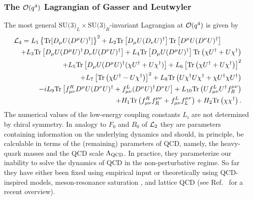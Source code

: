 \documentclass[twoside,12pt]{article}
\begin{document}
\subsubsection{The ${\cal O}(q^4)$ Lagrangian of Gasser and Leutwyler}
\label{subsubsec_clop4}
   The most general $\mbox{SU(3)}_L\times\mbox{SU(3)}_R$-invariant Lagrangian at ${\cal O}(q^4)$
is given by \cite{Gasser:1984gg}
\begin{eqnarray}
\label{3:3:1:l4gl}
\lefteqn{{\cal L}_4=
L_1 \left\{\mbox{Tr}[D_{\mu}U (D^{\mu}U)^{\dagger}] \right\}^2
+ L_2 \mbox{Tr} \left [D_{\mu}U (D_{\nu}U)^{\dagger}\right]
\mbox{Tr} \left [D^{\mu}U (D^{\nu}U)^{\dagger}\right]}\nonumber\\
& & + L_3 \mbox{Tr}\left[
D_{\mu}U (D^{\mu}U)^{\dagger}D_{\nu}U (D^{\nu}U)^{\dagger}
\right ]
+ L_4 \mbox{Tr} \left [ D_{\mu}U (D^{\mu}U)^{\dagger} \right ]
\mbox{Tr} \left( \chi U^{\dagger}+ U \chi^{\dagger} \right )
\nonumber \\
& & +L_5 \mbox{Tr} \left[ D_{\mu}U (D^{\mu}U)^{\dagger}
(\chi U^{\dagger}+ U \chi^{\dagger})\right]
+ L_6 \left[ \mbox{Tr} \left ( \chi U^{\dagger}+ U \chi^{\dagger} \right )
\right]^2
\nonumber \\
& & + L_7 \left[ \mbox{Tr} \left ( \chi U^{\dagger} - U \chi^{\dagger} \right )
\right]^2
+ L_8 \mbox{Tr} \left ( U \chi^{\dagger} U \chi^{\dagger}
+ \chi U^{\dagger} \chi U^{\dagger} \right )
\nonumber \\
& & -i L_9 \mbox{Tr} \left [ f^R_{\mu\nu} D^{\mu} U (D^{\nu} U)^{\dagger}
+ f^L_{\mu\nu} (D^{\mu} U)^{\dagger} D^{\nu} U \right ]
+ L_{10} \mbox{Tr} \left ( U f^L_{\mu\nu} U^{\dagger} f_R^{\mu\nu} \right )
\nonumber \\
& & + H_1 \mbox{Tr} \left ( f^R_{\mu\nu} f^{\mu\nu}_R +
f^L_{\mu\nu} f^{\mu\nu}_L \right )
+ H_2 \mbox{Tr} \left ( \chi \chi^{\dagger} \right ).
\end{eqnarray}
   The numerical values of the low-energy coupling constants $L_i$ are not
determined by chiral symmetry.
   In analogy to $F_0$ and $B_0$ of ${\cal L}_2$ they are parameters
containing information on the underlying dynamics
and should,
in principle, be calculable in terms of the (remaining) parameters of
QCD, namely, the heavy-quark masses and the QCD scale $\Lambda_{\rm QCD}$.
   In practice, they parameterize our inability to solve the
dynamics of QCD in the non-perturbative regime.
   So far they have either been fixed using empirical input
or theoretically using QCD-inspired models, meson-resonance
saturation \cite{Ecker:1988te} \cite{Pich:2008xj}, and lattice QCD (see Ref.\ \cite{Necco:2009cq} for
a recent overview).
\end{document}
